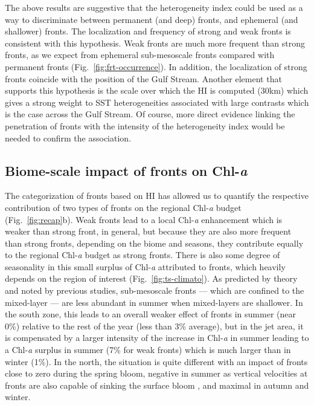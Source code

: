 The above results are suggestive that the heterogeneity index could be used as a way to discriminate between permanent (and deep) fronts, and ephemeral (and shallower) fronts.
The localization and frequency of strong and weak fronts is consistent with this hypothesis.
Weak fronts are much more frequent than strong fronts, as we expect from ephemeral sub-mesoscale fronts compared with permanent fronts (Fig.~\ref{fig:frt-occurrence}).
In addition, the localization of strong fronts coincide with the position of the Gulf Stream.
Another element that supports this hypothesis is the scale over which the HI is computed (30km) which gives a strong weight to SST heterogeneities associated with large contrasts which is the case across the Gulf Stream.
Of course, more direct evidence linking the penetration of fronts with the intensity of the heterogeneity index would be needed to confirm the association.

\subsection{Biome-scale impact of fronts on Chl\nobreakdash-\emph{a}}

The categorization of fronts based on HI has allowed us to quantify the respective contribution of two types of fronts on the regional Chl\nobreakdash-\emph{a} budget (Fig.~\ref{fig:recap}b).
Weak fronts lead to a local Chl\nobreakdash-\emph{a} enhancement which is weaker than strong front, in general, but because they are also more frequent than strong fronts, depending on the biome and seasons, they contribute equally to the regional Chl\nobreakdash-\emph{a} budget as strong fronts.
There is also some degree of seasonality in this small surplus of Chl\nobreakdash-\emph{a} attributed to fronts, which heavily depends on the region of interest (Fig.~\ref{fig:ts-climato}).
As predicted by theory and noted by previous studies, sub-mesoscale fronts --- which are confined to the mixed-layer --- are less abundant in summer when mixed-layers are shallower.
In the south zone, this leads to an overall weaker effect of fronts in summer (near 0\%) relative to the rest of the year (less than 3\% average), but in the jet area, it is compensated by a larger intensity of the increase in Chl\nobreakdash-\emph{a} in summer leading to a Chl\nobreakdash-\emph{a} surplus in summer (7\% for weak fronts) which is much larger than in winter (1\%).
In the north, the situation is quite different with an impact of fronts close to zero during the spring bloom, negative in summer as vertical velocities at fronts are also capable of sinking the surface bloom \citep{levy_2018}, and maximal in autumn and winter.

